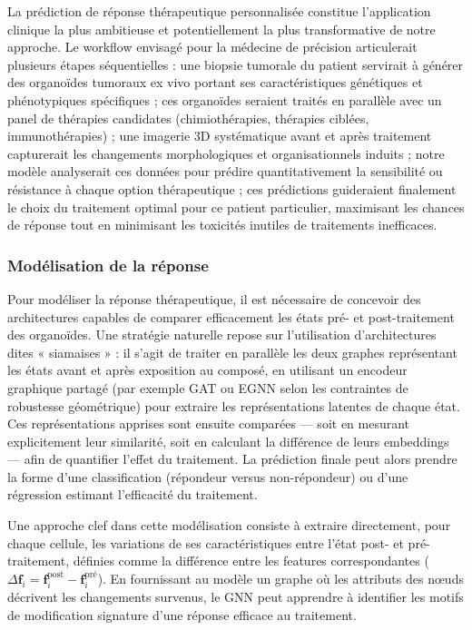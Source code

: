 La prédiction de réponse thérapeutique personnalisée constitue l'application clinique la plus ambitieuse et potentiellement la plus transformative de notre approche. Le workflow envisagé pour la médecine de précision articulerait plusieurs étapes séquentielles : une biopsie tumorale du patient servirait à générer des organoïdes tumoraux ex vivo portant ses caractéristiques génétiques et phénotypiques spécifiques ; ces organoïdes seraient traités en parallèle avec un panel de thérapies candidates (chimiothérapies, thérapies ciblées, immunothérapies) ; une imagerie 3D systématique avant et après traitement capturerait les changements morphologiques et organisationnels induits ; notre modèle analyserait ces données pour prédire quantitativement la sensibilité ou résistance à chaque option thérapeutique ; ces prédictions guideraient finalement le choix du traitement optimal pour ce patient particulier, maximisant les chances de réponse tout en minimisant les toxicités inutiles de traitements inefficaces.

\subsubsection{Modélisation de la réponse}

Pour modéliser la réponse thérapeutique, il est nécessaire de concevoir des architectures capables de comparer efficacement les états pré- et post-traitement des organoïdes. Une stratégie naturelle repose sur l'utilisation d'architectures dites « siamaises » : il s'agit de traiter en parallèle les deux graphes représentant les états avant et après exposition au composé, en utilisant un encodeur graphique partagé (par exemple GAT ou EGNN selon les contraintes de robustesse géométrique) pour extraire les représentations latentes de chaque état. Ces représentations apprises sont ensuite comparées — soit en mesurant explicitement leur similarité, soit en calculant la différence de leurs embeddings — afin de quantifier l'effet du traitement. La prédiction finale peut alors prendre la forme d'une classification (répondeur versus non-répondeur) ou d'une régression estimant l'efficacité du traitement.

Une approche clef dans cette modélisation consiste à extraire directement, pour chaque cellule, les variations de ses caractéristiques entre l’état post- et pré-traitement, définies comme la différence entre les features correspondantes (\(\Delta \mathbf{f}_i = \mathbf{f}_i^{\text{post}} - \mathbf{f}_i^{\text{pré}}\)). En fournissant au modèle un graphe où les attributs des nœuds décrivent les changements survenus, le GNN peut apprendre à identifier les motifs de modification signature d’une réponse efficace au traitement.

